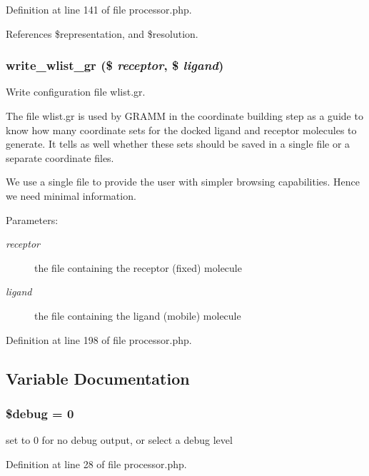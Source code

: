 Definition at line 141 of file processor.php.

References \$representation, and \$resolution.
\subsubsection{\setlength{\rightskip}{0pt plus 5cm}write\_\-wlist\_\-gr (\$ {\em receptor}, \$ {\em ligand})}\label{processor_8php_a13}


Write configuration file wlist.gr. 

The file wlist.gr is used by GRAMM in the coordinate building step as a guide to know how many coordinate sets for the docked ligand and receptor molecules to generate. It tells as well whether these sets should be saved in a single file or a separate coordinate files.

We use a single file to provide the user with simpler browsing capabilities. Hence we need minimal information.

\begin{Desc}
\item[Parameters:]
\begin{description}
\item[{\em receptor}]the file containing the receptor (fixed) molecule \item[{\em ligand}]the file containing the ligand (mobile) molecule \end{description}
\end{Desc}


Definition at line 198 of file processor.php.

\subsection{Variable Documentation}
\subsubsection{\setlength{\rightskip}{0pt plus 5cm}\$debug = 0}\label{processor_8php_a2}


set to 0 for no debug output, or select a debug level 



Definition at line 28 of file processor.php.


